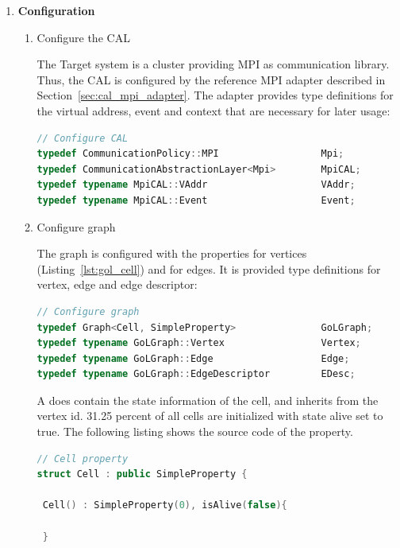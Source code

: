 \begin{enumerate}

\item \textbf{Configuration}
\begin{enumerate}

\item Configure the CAL
  
  The Target system is a cluster providing MPI as communication
  library. Thus, the CAL is configured by the reference MPI adapter
  described in Section~\ref{sec:cal_mpi_adapter}. The adapter provides
  type definitions for the virtual address, event and context that are
  necessary for later usage:

  \begin{lstlisting}[language=C++, label=lst:conf_cal, caption={}]
// Configure CAL
typedef CommunicationPolicy::MPI                  Mpi;
typedef CommunicationAbstractionLayer<Mpi>        MpiCAL;
typedef typename MpiCAL::VAddr                    VAddr;
typedef typename MpiCAL::Event                    Event;
  \end{lstlisting}

\item Configure graph

  The graph is configured with the properties  for vertices
  (Listing~\ref{lst:gol_cell}) and  for edges. It
  is provided type definitions for vertex, edge and edge descriptor:

  \begin{lstlisting}[language=C++, label=lst:conf_graph, caption={}]
// Configure graph
typedef Graph<Cell, SimpleProperty>               GoLGraph;
typedef typename GoLGraph::Vertex                 Vertex;
typedef typename GoLGraph::Edge                   Edge;
typedef typename GoLGraph::EdgeDescriptor         EDesc;
  \end{lstlisting}

  A  does contain the state information of the cell, and
  inherits from  the vertex id. 31.25 percent of
  all cells are initialized with state alive set to true.  The
  following listing shows the source code of the  property.
  
  \begin{lstlisting}[language=C++, label=lst:gol_cell, caption={}]
// Cell property    
struct Cell : public SimpleProperty { 

 Cell() : SimpleProperty(0), isAlive(false){ 
          
 }
        

\end{lstlisting}
\end{enumerate}
\end{enumerate}
